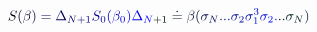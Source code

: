 \documentclass[12pt]{article}
\begin{document}
\makeatletter
\renewcommand*{\@textcolor}[3]{%
  \protect\leavevmode
  \begingroup
    \color#1{#2}#3%
  \endgroup
}
\makeatother
\begin{displaymath}
\mathcolor[RGB]{0,0,15}{S} \mathcolor[RGB]{0,0,30}{(} \mathcolor[RGB]{0,0,45}{\beta} \mathcolor[RGB]{0,0,60}{)} \mathcolor[RGB]{0,0,75}{=} \mathcolor[RGB]{0,0,90}{\Delta} _ { \mathcolor[RGB]{0,0,105}{N} \mathcolor[RGB]{0,0,120}{+} \mathcolor[RGB]{0,0,135}{1} } \mathcolor[RGB]{0,0,150}{S} _ { \mathcolor[RGB]{0,0,165}{0} } \mathcolor[RGB]{0,0,180}{(} \mathcolor[RGB]{0,0,195}{\beta} _ { \mathcolor[RGB]{0,0,210}{0} } \mathcolor[RGB]{0,0,225}{)} \mathcolor[RGB]{0,0,240}{\Delta} _ { \mathcolor[RGB]{0,0,255}{N} \mathcolor[RGB]{0,15,0}{+} \mathcolor[RGB]{0,15,15}{1} } \mathcolor[RGB]{0,15,30}{\doteq} \mathcolor[RGB]{0,15,45}{\beta} \mathcolor[RGB]{0,15,60}{(} \mathcolor[RGB]{0,15,75}{\sigma} _ { \mathcolor[RGB]{0,15,90}{N} } \mathcolor[RGB]{0,15,105}{.} \mathcolor[RGB]{0,15,120}{.} \mathcolor[RGB]{0,15,135}{.} \mathcolor[RGB]{0,15,150}{\sigma} _ { \mathcolor[RGB]{0,15,165}{2} } \mathcolor[RGB]{0,15,180}{\sigma} _ { \mathcolor[RGB]{0,15,195}{1} } ^ { \mathcolor[RGB]{0,15,210}{3} } \mathcolor[RGB]{0,15,225}{\sigma} _ { \mathcolor[RGB]{0,15,240}{2} } \mathcolor[RGB]{0,15,255}{.} \mathcolor[RGB]{0,30,0}{.} \mathcolor[RGB]{0,30,15}{.} \mathcolor[RGB]{0,30,30}{\sigma} _ { \mathcolor[RGB]{0,30,45}{N} } \mathcolor[RGB]{0,30,60}{)}
\end{displaymath}
\end{document}

